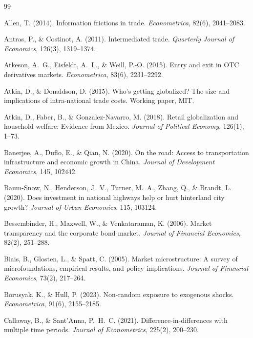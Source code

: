 \documentclass[12pt]{article}
\begin{document}
\begin{thebibliography}{99}
\setlength{\parskip}{4pt}

Allen, T. (2014). Information frictions in trade. \textit{Econometrica}, 82(6), 2041--2083.

Antras, P., \& Costinot, A. (2011). Intermediated trade. \textit{Quarterly Journal of Economics}, 126(3), 1319--1374.

Atkeson, A.~G., Eisfeldt, A.~L., \& Weill, P.-O. (2015). Entry and exit in OTC derivatives markets. \textit{Econometrica}, 83(6), 2231--2292.

Atkin, D., \& Donaldson, D. (2015). Who's getting globalized? The size and implications of intra-national trade costs. Working paper, MIT.

Atkin, D., Faber, B., \& Gonzalez-Navarro, M. (2018). Retail globalization and household welfare: Evidence from Mexico. \textit{Journal of Political Economy}, 126(1), 1--73.

Banerjee, A., Duflo, E., \& Qian, N. (2020). On the road: Access to transportation infrastructure and economic growth in China. \textit{Journal of Development Economics}, 145, 102442.

Baum-Snow, N., Henderson, J.~V., Turner, M.~A., Zhang, Q., \& Brandt, L. (2020). Does investment in national highways help or hurt hinterland city growth? \textit{Journal of Urban Economics}, 115, 103124.

Bessembinder, H., Maxwell, W., \& Venkataraman, K. (2006). Market transparency and the corporate bond market. \textit{Journal of Financial Economics}, 82(2), 251--288.

Biais, B., Glosten, L., \& Spatt, C. (2005). Market microstructure: A survey of microfoundations, empirical results, and policy implications. \textit{Journal of Financial Economics}, 73(2), 217--264.

Borusyak, K., \& Hull, P. (2023). Non-random exposure to exogenous shocks. \textit{Econometrica}, 91(6), 2155--2185.

Callaway, B., \& Sant'Anna, P.~H.~C. (2021). Difference-in-differences with multiple time periods. \textit{Journal of Econometrics}, 225(2), 200--230.


\end{thebibliography}
\end{document}
